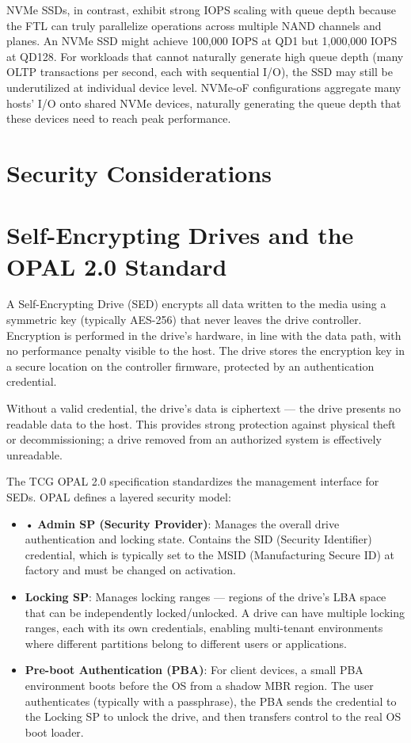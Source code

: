 NVMe SSDs, in contrast, exhibit strong IOPS scaling with queue depth because the FTL can truly parallelize operations across multiple NAND channels and planes. An NVMe SSD might achieve 100,000 IOPS at QD1 but 1,000,000 IOPS at QD128. For workloads that cannot naturally generate high queue depth (many OLTP transactions per second, each with sequential I/O), the SSD may still be underutilized at individual device level. NVMe-oF configurations aggregate many hosts'{} I/O onto shared NVMe devices, naturally generating the queue depth that these devices need to reach peak performance.

\section{Security Considerations}
\section{Self-Encrypting Drives and the OPAL 2.0 Standard}
A Self-Encrypting Drive (SED) encrypts all data written to the media using a symmetric key (typically AES-256) that never leaves the drive controller. Encryption is performed in the drive's hardware, in line with the data path, with no performance penalty visible to the host. The drive stores the encryption key in a secure location on the controller firmware, protected by an authentication credential.

Without a valid credential, the drive's data is ciphertext --- the drive presents no readable data to the host. This provides strong protection against physical theft or decommissioning; a drive removed from an authorized system is effectively unreadable.

The TCG OPAL 2.0 specification standardizes the management interface for SEDs. OPAL defines a layered security model:

\begin{itemize}
  \item • \textbf{Admin SP (Security Provider)}: Manages the overall drive authentication and locking state. Contains the SID (Security Identifier) credential, which is typically set to the MSID (Manufacturing Secure ID) at factory and must be changed on activation.
  \item \textbf{Locking SP}: Manages locking ranges --- regions of the drive's LBA space that can be independently locked/unlocked. A drive can have multiple locking ranges, each with its own credentials, enabling multi-tenant environments where different partitions belong to different users or applications.
  \item \textbf{Pre-boot Authentication (PBA)}: For client devices, a small PBA environment boots before the OS from a shadow MBR region. The user authenticates (typically with a passphrase), the PBA sends the credential to the Locking SP to unlock the drive, and then transfers control to the real OS boot loader.
\end{itemize}

